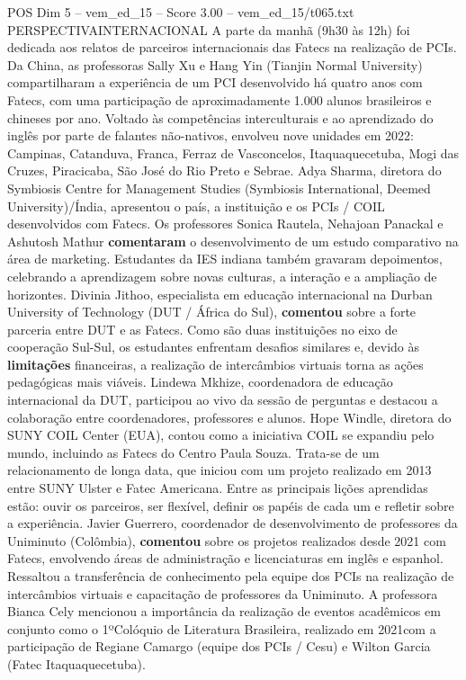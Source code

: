 \begin{textsample}{POS Dim 5 – vem\_ed\_15 – Score 3.00 – vem\_ed\_15/t065.txt}  \label{ex:f5_pos_120}
PERSPECTIVAINTERNACIONAL A parte da manhã (9h30 às 12h) foi dedicada aos relatos de parceiros internacionais das Fatecs na realização de PCIs.
Da China, as professoras Sally Xu e Hang Yin (Tianjin Normal University) compartilharam a experiência de um PCI desenvolvido há quatro anos com Fatecs, com uma participação de aproximadamente 1.000 alunos brasileiros e chineses por ano.
Voltado às competências interculturais e ao aprendizado do inglês por parte de falantes não-nativos, envolveu nove unidades em 2022: Campinas, Catanduva, Franca, Ferraz de Vasconcelos, Itaquaquecetuba, Mogi das Cruzes, Piracicaba, São José do Rio Preto e Sebrae.
Adya Sharma, diretora do Symbiosis Centre for Management Studies (Symbiosis International, Deemed University)/Índia, apresentou o país, a instituição e os PCIs / COIL desenvolvidos com Fatecs.
Os professores Sonica Rautela, Nehajoan Panackal e Ashutosh Mathur \textbf{comentaram} o desenvolvimento de um estudo comparativo na área de marketing.
Estudantes da IES indiana também gravaram depoimentos, celebrando a aprendizagem sobre novas culturas, a interação e a ampliação de horizontes.
Divinia Jithoo, especialista em educação internacional na Durban University of Technology (DUT / África do Sul), \textbf{comentou} sobre a forte parceria entre DUT e as Fatecs.
Como são duas instituições no eixo de cooperação Sul-Sul, os estudantes enfrentam desafios similares e, devido às \textbf{limitações} financeiras, a realização de intercâmbios virtuais torna as ações pedagógicas mais viáveis.
Lindewa Mkhize, coordenadora de educação internacional da DUT, participou ao vivo da sessão de perguntas e destacou a colaboração entre coordenadores, professores e alunos.
Hope Windle, diretora do SUNY COIL Center (EUA), contou como a iniciativa COIL se expandiu pelo mundo, incluindo as Fatecs do Centro Paula Souza.
Trata-se de um relacionamento de longa data, que iniciou com um projeto realizado em 2013 entre SUNY Ulster e Fatec Americana.
Entre as principais lições aprendidas estão: ouvir os parceiros, ser flexível, definir os papéis de cada um e refletir sobre a experiência.
Javier Guerrero, coordenador de desenvolvimento de professores da Uniminuto (Colômbia), \textbf{comentou} sobre os projetos realizados desde 2021 com Fatecs, envolvendo áreas de administração e licenciaturas em inglês e espanhol.
Ressaltou a transferência de conhecimento pela equipe dos PCIs na realização de intercâmbios virtuais e capacitação de professores da Uniminuto.
A professora Bianca Cely mencionou a importância da realização de eventos acadêmicos em conjunto como o 1ºColóquio de Literatura Brasileira, realizado em 2021com a participação de Regiane Camargo (equipe dos PCIs / Cesu) e Wilton Garcia (Fatec Itaquaquecetuba).

\end{textsample}
